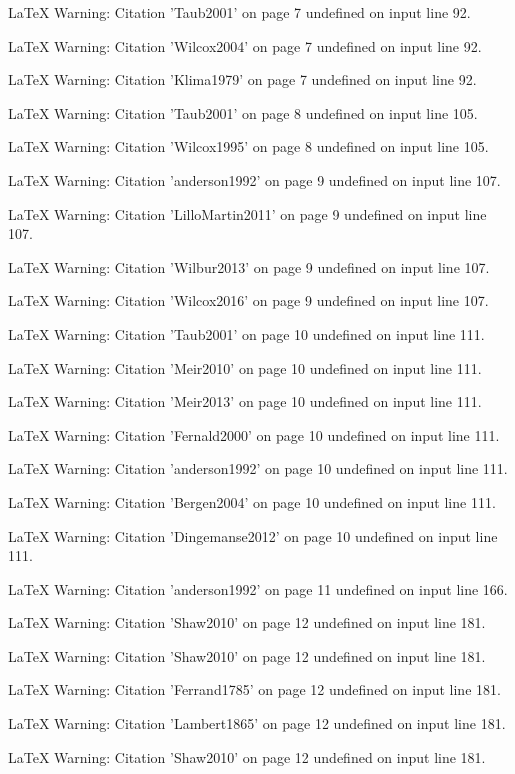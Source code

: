 LaTeX Warning: Citation 'Taub2001' on page 7 undefined on input line 92.


LaTeX Warning: Citation 'Wilcox2004' on page 7 undefined on input line 92.


LaTeX Warning: Citation 'Klima1979' on page 7 undefined on input line 92.


LaTeX Warning: Citation 'Taub2001' on page 8 undefined on input line 105.


LaTeX Warning: Citation 'Wilcox1995' on page 8 undefined on input line 105.


LaTeX Warning: Citation 'anderson1992' on page 9 undefined on input line 107.


LaTeX Warning: Citation 'LilloMartin2011' on page 9 undefined on input line 107.


LaTeX Warning: Citation 'Wilbur2013' on page 9 undefined on input line 107.


LaTeX Warning: Citation 'Wilcox2016' on page 9 undefined on input line 107.


LaTeX Warning: Citation 'Taub2001' on page 10 undefined on input line 111.


LaTeX Warning: Citation 'Meir2010' on page 10 undefined on input line 111.


LaTeX Warning: Citation 'Meir2013' on page 10 undefined on input line 111.


LaTeX Warning: Citation 'Fernald2000' on page 10 undefined on input line 111.


LaTeX Warning: Citation 'anderson1992' on page 10 undefined on input line 111.


LaTeX Warning: Citation 'Bergen2004' on page 10 undefined on input line 111.


LaTeX Warning: Citation 'Dingemanse2012' on page 10 undefined on input line 111.


LaTeX Warning: Citation 'anderson1992' on page 11 undefined on input line 166.


LaTeX Warning: Citation 'Shaw2010' on page 12 undefined on input line 181.


LaTeX Warning: Citation 'Shaw2010' on page 12 undefined on input line 181.


LaTeX Warning: Citation 'Ferrand1785' on page 12 undefined on input line 181.


LaTeX Warning: Citation 'Lambert1865' on page 12 undefined on input line 181.


LaTeX Warning: Citation 'Shaw2010' on page 12 undefined on input line 181.


